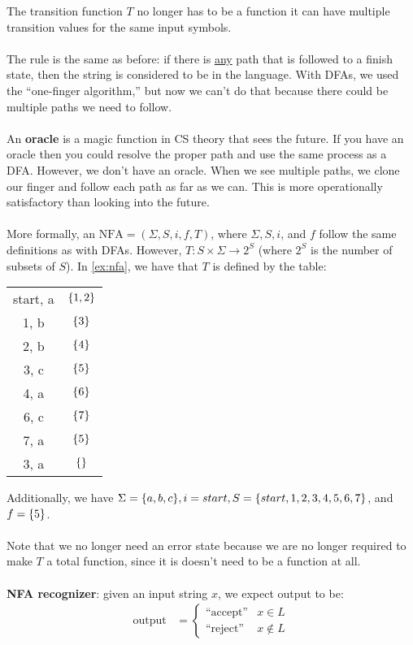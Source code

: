 \documentclass[]{article}
\DeclarePairedDelimiter{\set}{\lbrace}{\rbrace}
\theoremstyle{definition}
\begin{document}
			The transition function $T$ no longer has to be a function \textendash{} it can have multiple transition values for the same input symbols.
			\\ \\
			The rule is the same as before: if there is \underline{any} path that is followed to a finish state, then the string is considered to be in the language. With DFAs, we used the ``one-finger algorithm,'' but now we can't do that because there could be multiple paths we need to follow.
			\\ \\
			An \textbf{oracle} is a magic function in CS theory that sees the future. If you have an oracle then you could resolve the proper path and use the same process as a DFA. However, we don't have an oracle. When we see multiple paths, we clone our finger and follow each path as far as we can. This is more operationally satisfactory than looking into the future.
			\\ \\
			More formally, an $\text{NFA} = (\Sigma, S, i, f, T)$, where $\Sigma, S, i$, and $f$ follow the same definitions as with DFAs. However, $T: S \times \Sigma \to 2^S$ (where $2^S$ is the number of subsets of $S$). In \ref{ex:nfa}, we have that $T$ is defined by the table:
			\begin{center}
				\begin{tabular}{|c|c|}
					\hline
					start, a & $\set{1, 2}$ \\
					1, b & $\set{3}$ \\
					2, b & $\set{4}$ \\
					3, c & $\set{5}$ \\
					4, a & $\set{6}$ \\
					6, c & $\set{7}$ \\
					7, a & $\set{5}$ \\
					3, a & $\set{}$ \\ \hline
				\end{tabular}
			\end{center}
			Additionally, we have $\Sigma = \set{a, b, c}, i = start, S = \set{start, 1, 2, 3, 4, 5, 6, 7}$, and $f = \set{5}$.
			\\ \\
			Note that we no longer need an error state because we are no longer required to make $T$ a total function, since it is doesn't need to be a function at all. 
			\\ \\	
			\textbf{NFA recognizer}: given an input string $x$, we expect output to be:
			\begin{align*}
				\text{output} &= \begin{cases}
					\text{``accept''} & x \in L \\
					\text{``reject''} & x \not \in L
				\end{cases}
			\end{align*}
\end{document}
